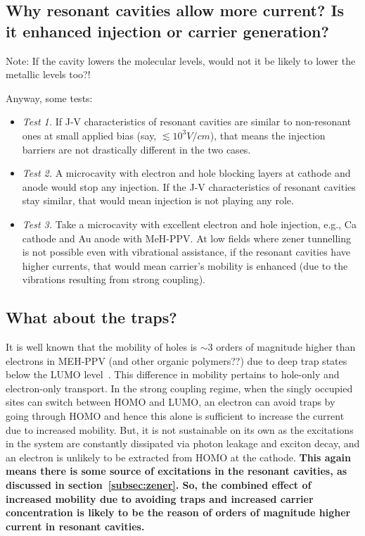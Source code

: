 \documentclass[a4paper,twocolumn]{revtex4-1} %
\begin{document}
\subsection{Why resonant cavities allow more current? Is it enhanced injection or carrier generation?}

Note: If the cavity lowers the molecular levels, would not it be likely to lower the metallic levels too?!

Anyway, some tests:
\begin{itemize}
 
 \item {\it Test 1. }
If J-V characteristics of resonant cavities are similar
 to non-resonant ones at small applied bias (say, $\lesssim10^{3}V/cm$),
that means the injection barriers are not drastically different
in the two cases.
 
 \item {\it Test 2. }
A microcavity with electron and hole blocking layers at cathode and anode would stop any injection.
If the J-V characteristics of resonant cavities stay similar,
that would mean injection is not playing any role.

 \item {\it Test 3. }
Take a microcavity with excellent electron and hole injection, e.g., Ca cathode and Au anode with MeH-PPV.
At low fields where zener tunnelling is not possible even with vibrational assistance,
if the resonant cavities have higher currents,
that would mean carrier's mobility is enhanced (due to the vibrations resulting from strong coupling).

\end{itemize}


\subsection{What about the traps?}
It is well known that the mobility of holes is $\sim 3$ orders of magnitude higher than electrons in MEH-PPV (and other organic polymers??) due to deep trap states below the LUMO level~\cite{Zhang10}.
This difference in mobility pertains to hole-only and electron-only transport.
In the strong coupling regime, when the singly occupied sites can switch between HOMO and LUMO, an electron can avoid traps by going through HOMO and hence this alone is sufficient to increase the current due to increased mobility. 
But, it is not sustainable on its own as the excitations in the system are constantly dissipated via photon leakage and exciton decay, and an electron is unlikely to be extracted from HOMO at the cathode. 
{\bf This again means there is some source of excitations in the resonant cavities, as discussed in section~\ref{subsec:zener}. 
So, the combined effect of increased mobility due to avoiding traps and increased carrier concentration is likely to be the reason of orders of magnitude higher current in resonant cavities.}
\end{document}
